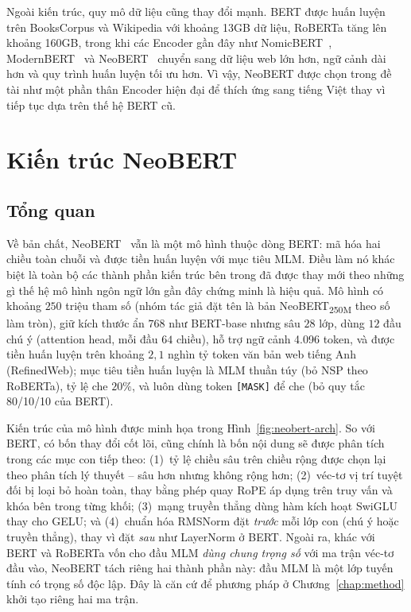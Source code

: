 Ngoài kiến trúc, quy mô dữ liệu cũng thay đổi mạnh. BERT được huấn luyện trên BooksCorpus
và Wikipedia với khoảng 13GB dữ liệu, RoBERTa tăng lên khoảng 160GB, trong khi các Encoder
gần đây như NomicBERT~\cite{nussbaum2024nomic}, ModernBERT~\cite{warner2024modernbert} và
NeoBERT~\cite{lebreton2025neobert} chuyển sang dữ liệu web lớn hơn, ngữ cảnh dài hơn và
quy trình huấn luyện tối ưu hơn. Vì vậy, NeoBERT được chọn trong đề tài như một phần thân
Encoder hiện đại để thích ứng sang tiếng Việt thay vì tiếp tục dựa trên thế hệ BERT cũ.

\section{Kiến trúc NeoBERT}
\label{sec:neobert}

\subsection{Tổng quan}
\label{subsec:neobert-overview}

Về bản chất, NeoBERT~\cite{lebreton2025neobert} vẫn là một mô hình thuộc dòng BERT: mã
hóa hai chiều toàn chuỗi và được tiền huấn luyện với mục tiêu MLM. Điều làm nó khác biệt
là toàn bộ các thành phần kiến trúc bên trong đã được thay mới theo những gì thế hệ mô hình
ngôn ngữ lớn gần đây chứng minh là hiệu quả. Mô hình có khoảng $250$ triệu tham số (nhóm tác giả
đặt tên là bản NeoBERT\textsubscript{250M} theo số làm tròn), giữ kích thước
ẩn $768$ như BERT-base nhưng sâu $28$ lớp, dùng $12$ đầu chú ý (attention head, mỗi đầu $64$ chiều), hỗ
trợ ngữ cảnh 4.096 token, và được tiền huấn luyện trên khoảng $2{,}1$ nghìn tỷ token văn
bản web tiếng Anh (RefinedWeb); mục tiêu tiền huấn luyện là MLM thuần túy (bỏ NSP theo
RoBERTa), tỷ lệ che $20\%$, và luôn dùng token \texttt{[MASK]} để che (bỏ quy tắc
80/10/10 của BERT).

Kiến trúc của mô hình được minh họa trong Hình~\ref{fig:neobert-arch}. So với BERT, có
bốn thay đổi cốt lõi, cũng chính là bốn nội dung sẽ được phân tích trong các mục con tiếp
theo: (1)~tỷ lệ chiều sâu trên chiều rộng được chọn lại theo phân tích lý thuyết -- sâu
hơn nhưng không rộng hơn; (2)~véc-tơ vị trí tuyệt đối bị loại bỏ hoàn toàn, thay bằng phép
quay RoPE áp dụng trên truy vấn và khóa bên trong từng khối; (3)~mạng truyền thẳng dùng
hàm kích hoạt SwiGLU thay cho GELU; và (4)~chuẩn hóa RMSNorm đặt \textit{trước} mỗi lớp
con (chú ý hoặc truyền thẳng), thay vì đặt \textit{sau} như LayerNorm ở BERT. Ngoài ra, khác với
BERT và RoBERTa vốn cho đầu MLM \textit{dùng chung trọng số} với ma trận véc-tơ đầu vào,
NeoBERT tách riêng hai thành phần này: đầu MLM là một lớp tuyến tính có trọng
số độc lập. Đây là căn cứ để phương pháp ở Chương~\ref{chap:method} khởi tạo riêng hai ma trận.

